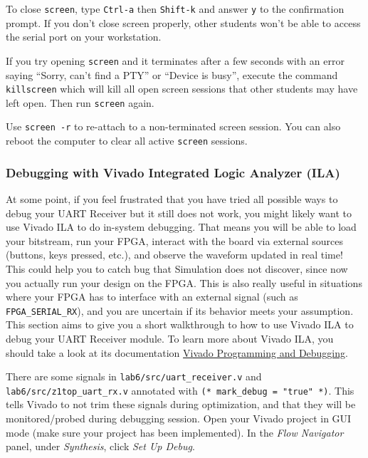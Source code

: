 \documentclass[11pt]{article}
\begin{document}
To close \verb|screen|, type \verb|Ctrl-a| then \verb|Shift-k| and answer \verb|y| to the confirmation prompt.
If you don't close screen properly, other students won't be able to access the serial port on your workstation.

If you try opening \verb|screen| and it terminates after a few seconds with an error saying ``Sorry, can't find a PTY'' or ``Device is busy'', execute the command \verb|killscreen| which will kill all open screen sessions that other students may have left open.
Then run \verb|screen| again.

Use \verb|screen -r| to re-attach to a non-terminated screen session. You can also reboot the computer to clear all active \verb|screen| sessions.

\subsubsection{Debugging with Vivado Integrated Logic Analyzer (ILA)}

At some point, if you feel frustrated that you have tried all possible ways to debug your UART Receiver but it still does not work, you might likely want to use Vivado ILA to do in-system debugging. That means you will be able to load your bitstream, run your FPGA, interact with the board via external sources (buttons, keys pressed, etc.), and observe the waveform updated in real time! This could help you to catch bug that Simulation does not discover, since now you actually run your design on the FPGA. This is also really useful in situations where your FPGA has to interface with an external signal (such as \verb|FPGA_SERIAL_RX|), and you are uncertain if its behavior meets your assumption. This section aims to give you a short walkthrough to how to use Vivado ILA to debug your UART Receiver module. To learn more about Vivado ILA, you should take a look at its documentation \href{https://www.xilinx.com/support/documentation/sw_manuals/xilinx2019_2/ug908-vivado-programming-debugging.pdf}{Vivado Programming and Debugging}.

There are some signals in \verb|lab6/src/uart_receiver.v| and \verb|lab6/src/z1top_uart_rx.v| annotated with \verb|(* mark_debug = "true" *)|. This tells Vivado to not trim these signals during optimization, and that they will be monitored/probed during debugging session. Open your Vivado project in GUI mode (make sure your project has been implemented). In the \emph{Flow Navigator} panel, under \emph{Synthesis}, click \emph{Set Up Debug}.
\end{document}
